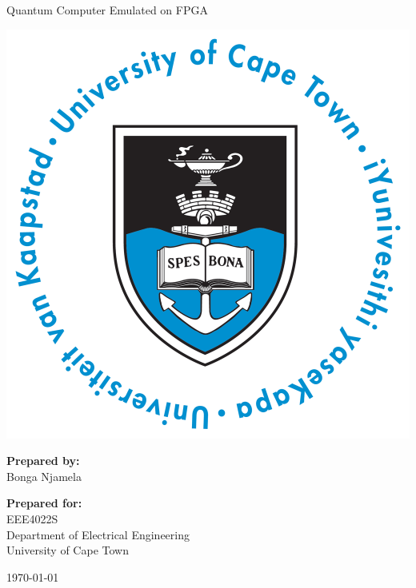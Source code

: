 \thispagestyle{empty}
\begin{center}
    
\Huge

\vspace{5cm}

Quantum Computer Emulated on FPGA

\vspace{2.5cm}

\includegraphics[width=0.4\linewidth]{FrontMatter/UCT_logo.png}

\vfill

\large
\textbf{Prepared by:}\\
Bonga Njamela

\vspace{1cm}

\textbf{Prepared for:}\\
EEE4022S\\
Department of Electrical Engineering\\
University of Cape Town

\vspace{2cm}

\today


\end{center}